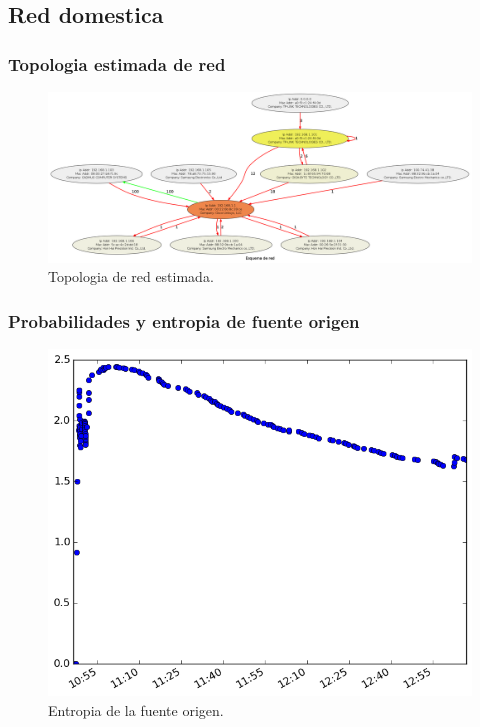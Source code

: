 \subsection{Red domestica}
\subsubsection{Topologia estimada de red}
\begin{figure}[h!]
  \centering	
	\includegraphics[scale=0.22]{../experimentacion-svilerino/casa/graph.png}
  \caption{Topologia de red estimada.}
	\label{fig:grafo-casa}
\end{figure}


\subsubsection{Probabilidades y entropia de fuente origen}
\begin{figure}[h!]
  \centering
	\includegraphics[scale=0.66]{../experimentacion-svilerino/casa/entropy_src.png}
  \caption{Entropia de la fuente origen.}
	\label{fig:entropia-src-casa}
\end{figure}

